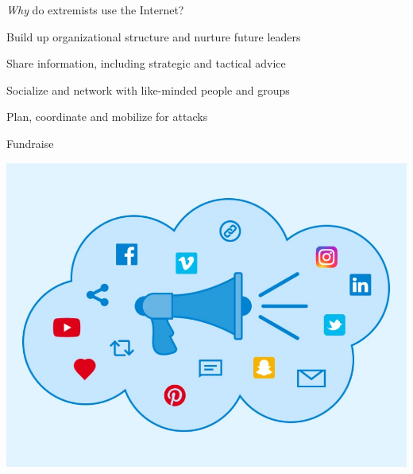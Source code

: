 \documentclass[nobackground,dvipsnames,table]{beamer}
\begin{document}
\begin{frame}{\emph{Why} do extremists use the Internet?}

\begin{minipage}[b]{0.4\textwidth}
    \raggedright %
    \small{
    \begin{itemize}
    \footnotesize{
        \item Build up organizational structure and nurture future leaders
        \item Share information, including strategic and tactical advice 
        \item Socialize and network with like-minded people and groups
        \item Plan, coordinate and mobilize for attacks
        \item Fundraise 
        }
    \end{itemize} 
    }
\end{minipage}
\hfill
\includegraphics[scale=0.3]{img/fig1.jpg}

\end{frame}
\end{document}
